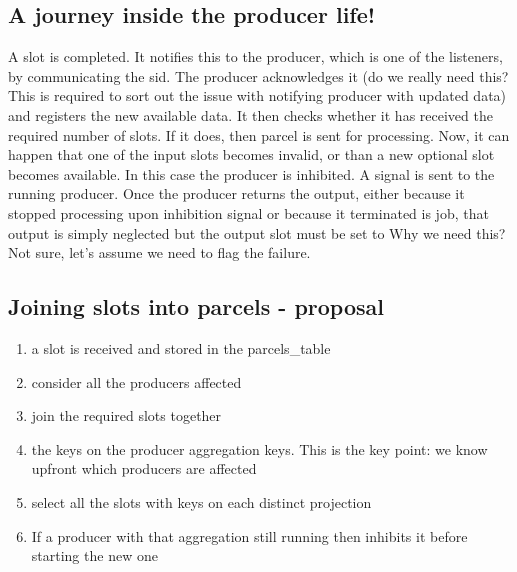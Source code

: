 \documentclass[letterpaper,10pt,english]{sphinxmanual}
\begin{document}
\subsection{A journey inside the producer life!}
\label{\detokenize{slot_prod:a-journey-inside-the-producer-life}}
A slot is completed. It notifies this to the producer, which is one of the
listeners, by communicating the sid.
The producer acknowledges it (do we really need this?  This is
required to sort out the issue with notifying producer with updated data) and
registers the
new available data. It then checks whether it has received the required number
of slots. If it does, then parcel is sent for processing. Now, it can happen
that one of the input slots becomes invalid, or than a new optional slot
becomes available. In this case the producer is inhibited. A signal is sent
to the running producer. Once the producer returns the output, either because
it stopped processing upon inhibition signal or because it terminated is job,
that output is simply neglected but the output slot must be set to 
Why we need this? Not sure, let’s assume we need to flag the failure.


\subsection{Joining slots into parcels - proposal}
\label{\detokenize{slot_prod:joining-slots-into-parcels-proposal}}\begin{enumerate}
\item {} 
a slot is received and stored in the parcels\_table

\item {} 
consider all the producers affected

\item {} 
join the required slots together

\item {} 
 the keys on the producer aggregation keys.
This is the key point: we know upfront which producers are affected

\item {} 
select all the slots with keys on each distinct projection

\item {} 
If a producer with that aggregation still running then inhibits it before
starting the new one

\end{enumerate}
\end{document}
